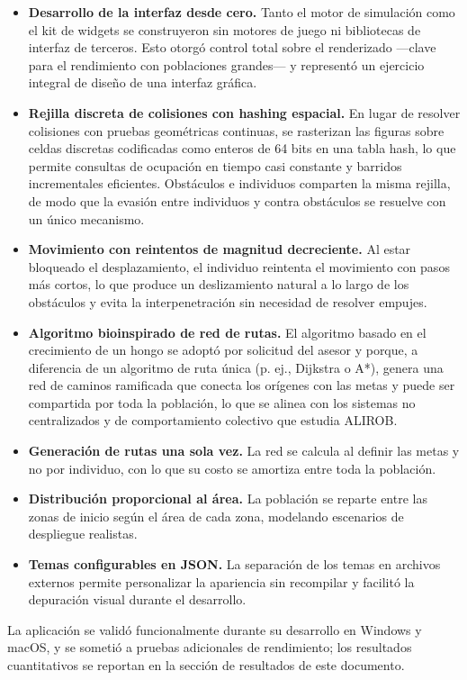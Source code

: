 \documentclass[12pt,a4paper]{article}
\begin{document}
\begin{itemize}
    \item \textbf{Desarrollo de la interfaz desde cero.} Tanto el motor de simulación como el kit de widgets se construyeron sin motores de juego ni bibliotecas de interfaz de terceros. Esto otorgó control total sobre el renderizado —clave para el rendimiento con poblaciones grandes— y representó un ejercicio integral de diseño de una interfaz gráfica.
    \item \textbf{Rejilla discreta de colisiones con hashing espacial.} En lugar de resolver colisiones con pruebas geométricas continuas, se rasterizan las figuras sobre celdas discretas codificadas como enteros de 64 bits en una tabla hash, lo que permite consultas de ocupación en tiempo casi constante y barridos incrementales eficientes. Obstáculos e individuos comparten la misma rejilla, de modo que la evasión entre individuos y contra obstáculos se resuelve con un único mecanismo.
    \item \textbf{Movimiento con reintentos de magnitud decreciente.} Al estar bloqueado el desplazamiento, el individuo reintenta el movimiento con pasos más cortos, lo que produce un deslizamiento natural a lo largo de los obstáculos y evita la interpenetración sin necesidad de resolver empujes.
    \item \textbf{Algoritmo bioinspirado de red de rutas.} El algoritmo basado en el crecimiento de un hongo se adoptó por solicitud del asesor y porque, a diferencia de un algoritmo de ruta única (p. ej., Dijkstra o A*), genera una red de caminos ramificada que conecta los orígenes con las metas y puede ser compartida por toda la población, lo que se alinea con los sistemas no centralizados y de comportamiento colectivo que estudia ALIROB.
    \item \textbf{Generación de rutas una sola vez.} La red se calcula al definir las metas y no por individuo, con lo que su costo se amortiza entre toda la población.
    \item \textbf{Distribución proporcional al área.} La población se reparte entre las zonas de inicio según el área de cada zona, modelando escenarios de despliegue realistas.
    \item \textbf{Temas configurables en JSON.} La separación de los temas en archivos externos permite personalizar la apariencia sin recompilar y facilitó la depuración visual durante el desarrollo.
\end{itemize}

La aplicación se validó funcionalmente durante su desarrollo en Windows y macOS, y se sometió a pruebas adicionales de rendimiento; los resultados cuantitativos se reportan en la sección de resultados de este documento.
\end{document}
